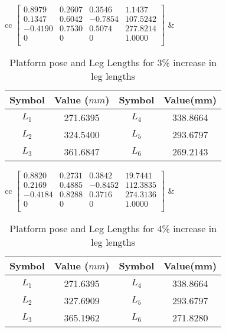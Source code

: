 \documentclass[10pt]{article}
\begin{document}
\begin{table*}[h!]
	\centering
	\begin{tabular}{cc}
		$\begin{bmatrix}
		0.8979  & 0.2607 & 0.3546  & 1.1437   \\ 
		0.1347  & 0.6042 & -0.7854 & 107.5242 \\ 
		-0.4190 & 0.7530 & 0.5074  & 277.8214 \\ 
		0       & 0      & 0       & 1.0000   \\ 
		\end{bmatrix}$
		& 
		\begin{tabular}{cccc}
			\hline
			Symbol & Value ($mm$) & Symbol & Value(mm) \\
			\hline
			$L_1$ & 271.6395 & $L_4$ & 338.8664\\
			$L_2$ & 324.5400 & $L_5$ & 293.6797\\
			$L_3$ & 361.6847 & $L_6$ & 269.2143\\	 	\hline
		\end{tabular}
	\end{tabular}
	\caption{Platform pose and Leg Lengths for 3\% increase in leg lengths}
\end{table*}

\begin{table*}[h!]
	\centering
	\begin{tabular}{cc}
		$\begin{bmatrix}
		0.8820  & 0.2731 & 0.3842  & 19.7441  \\ 
		0.2169  & 0.4885 & -0.8452 & 112.3835 \\ 
		-0.4184 & 0.8288 & 0.3716  & 274.3136 \\ 
		0       & 0      & 0       & 1.0000   \\ 
		\end{bmatrix}$
		& 
		\begin{tabular}{cccc}
			\hline
			Symbol & Value ($mm$) & Symbol & Value(mm) \\
			\hline
			$L_1$ & 271.6395 & $L_4$ & 338.8664\\
			$L_2$ & 327.6909 & $L_5$ & 293.6797\\
			$L_3$ & 365.1962 & $L_6$ & 271.8280\\	 	\hline
		\end{tabular}
	\end{tabular}
	\caption{Platform pose and Leg Lengths for 4\% increase in leg lengths}
\end{table*}
\end{document}
